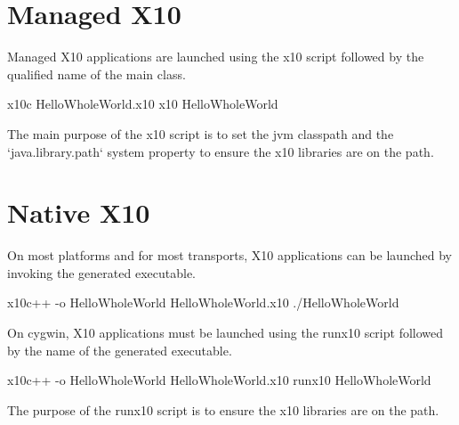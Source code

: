 \section{Managed X10}
\label{sect:RunningManaged}


Managed X10 applications are launched using the x10 script followed by the qualified name of the main class.

\begin{xten}
x10c HelloWholeWorld.x10
x10 HelloWholeWorld
\end{xten}

The main purpose of the x10 script is to set the jvm classpath and the
\xcd`java.library.path` system property to ensure the x10 libraries are on the
path.  


\section{Native X10}
\label{sect:RunningNative}

On most platforms and for most transports, X10 applications can be launched by invoking the generated executable.

\begin{xten}
x10c++ -o HelloWholeWorld HelloWholeWorld.x10
./HelloWholeWorld
\end{xten}

On cygwin, X10 applications must be launched using the runx10 script followed by the name of the generated executable.

\begin{xten}
x10c++ -o HelloWholeWorld HelloWholeWorld.x10
runx10 HelloWholeWorld
\end{xten}
The purpose of the runx10 script is to ensure the x10 libraries are on the path. 
